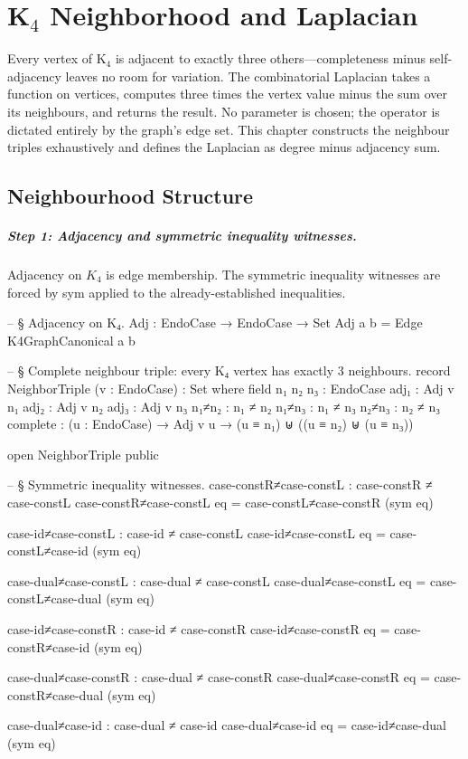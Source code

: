 \documentclass[11pt,a4paper]{book}
\def\texttt#1{#1}%
\begin{document}
\chapter{K$_4$ Neighborhood and Laplacian}

Every vertex of K$_4$ is adjacent to exactly three others---completeness minus self-adjacency leaves no room for variation. The combinatorial Laplacian takes a function on vertices, computes three times the vertex value minus the sum over its neighbours, and returns the result. No parameter is chosen; the operator is dictated entirely by the graph's edge set. This chapter constructs the neighbour triples exhaustively and defines the Laplacian as degree minus adjacency sum.

\section{Neighbourhood Structure}

\paragraph{Step 1: Adjacency and symmetric inequality witnesses.}
Adjacency on $K_4$ is edge membership.
The symmetric inequality witnesses are forced by \texttt{sym} applied to the already-established inequalities.

\begin{code}
-- § Adjacency on K₄.
Adj : EndoCase → EndoCase → Set
Adj a b = Edge K4GraphCanonical a b

-- § Complete neighbour triple: every K₄ vertex has exactly 3 neighbours.
record NeighborTriple (v : EndoCase) : Set where
  field
    n₁ n₂ n₃ : EndoCase
    adj₁     : Adj v n₁
    adj₂     : Adj v n₂
    adj₃     : Adj v n₃
    n₁≠n₂     : n₁ ≠ n₂
    n₁≠n₃     : n₁ ≠ n₃
    n₂≠n₃     : n₂ ≠ n₃
    complete : (u : EndoCase) → Adj v u → (u ≡ n₁) ⊎ ((u ≡ n₂) ⊎ (u ≡ n₃))

open NeighborTriple public

-- § Symmetric inequality witnesses.
case-constR≠case-constL : case-constR ≠ case-constL
case-constR≠case-constL eq = case-constL≠case-constR (sym eq)

case-id≠case-constL : case-id ≠ case-constL
case-id≠case-constL eq = case-constL≠case-id (sym eq)

case-dual≠case-constL : case-dual ≠ case-constL
case-dual≠case-constL eq = case-constL≠case-dual (sym eq)

case-id≠case-constR : case-id ≠ case-constR
case-id≠case-constR eq = case-constR≠case-id (sym eq)

case-dual≠case-constR : case-dual ≠ case-constR
case-dual≠case-constR eq = case-constR≠case-dual (sym eq)

case-dual≠case-id : case-dual ≠ case-id
case-dual≠case-id eq = case-id≠case-dual (sym eq)
\end{code}
\end{document}
